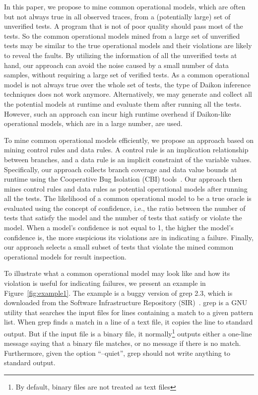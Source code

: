 \documentclass{sig-alternate}
\begin{document}
In this paper, we propose to mine common operational models, which
are often but not always true in all observed traces, from a
(potentially large) set of unverified tests. A program that is not
of poor quality should pass most of the tests. So the common
operational models mined from a large set of unverified tests may be
similar to the true operational models and their violations are
likely to reveal the faults. By utilizing the information of all the
unverified tests at hand, our approach can avoid the noise caused by
a small number of data samples, without requiring a large set of
verified tests. As a common operational model is not always true
over the whole set of tests, the type of Daikon inference techniques
does not work anymore. Alternatively, we may generate and collect
all the potential models at runtime and evaluate them after running
all the tests. However, such an approach can incur high runtime
overhead if Daikon-like operational models, which are in a large
number, are used.






To mine common operational models efficiently, we propose an
approach based on mining control rules and data rules. A control
rule is an implication relationship between branches, and a data
rule is an implicit constraint of the variable values. Specifically,
our approach collects branch coverage and data value bounds at
runtime using the Cooperative Bug Isolation (CBI)
tools~\cite{Liblit04}. Our approach then mines control rules and
data rules as potential operational models after running all the
tests. The likelihood of a common operational model to be a true
oracle is evaluated using the concept of confidence, i.e., the ratio
between the number of tests that satisfy the model and the number of
tests that satisfy or violate the model. When a model's confidence
is not equal to 1, the higher the model's confidence is, the more
suspicious its violations are in indicating a failure. Finally, our
approach selects a small subset of tests that violate the mined
common operational models for result inspection.


To illustrate what a common operational model may look like and how
its violation is useful for indicating failures, we present an
example in Figure~\ref{fig:example1}. The example is a buggy version
of grep 2.3, which is downloaded from the Software Infrastructure
Repository (SIR)~\cite{SIR}. grep is a GNU utility that searches the
input files for lines containing a match to a given pattern list.
When grep finds a match in a line of a text file, it copies the line
to standard output. But if the input file is a binary file, it
normally\footnote{By default, binary files are not treated as text
files} outputs either a one-line message saying that a binary file
matches, or no message if there is no match. Furthermore, given the
option ``--quiet'', grep should not write anything to standard
output.
\end{document}

